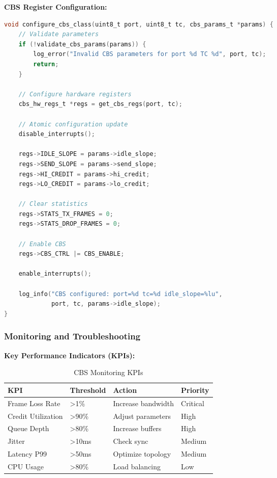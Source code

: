 \documentclass[10pt, journal, compsoc]{IEEEtran}
\begin{document}
\textbf{CBS Register Configuration:}
\begin{lstlisting}[language=C, caption=CBS Configuration Template]
void configure_cbs_class(uint8_t port, uint8_t tc, cbs_params_t *params) {
    // Validate parameters
    if (!validate_cbs_params(params)) {
        log_error("Invalid CBS parameters for port %d TC %d", port, tc);
        return;
    }
    
    // Configure hardware registers
    cbs_hw_regs_t *regs = get_cbs_regs(port, tc);
    
    // Atomic configuration update
    disable_interrupts();
    
    regs->IDLE_SLOPE = params->idle_slope;
    regs->SEND_SLOPE = params->send_slope;
    regs->HI_CREDIT = params->hi_credit;
    regs->LO_CREDIT = params->lo_credit;
    
    // Clear statistics
    regs->STATS_TX_FRAMES = 0;
    regs->STATS_DROP_FRAMES = 0;
    
    // Enable CBS
    regs->CBS_CTRL |= CBS_ENABLE;
    
    enable_interrupts();
    
    log_info("CBS configured: port=%d tc=%d idle_slope=%lu", 
             port, tc, params->idle_slope);
}
\end{lstlisting}

\subsubsection{Monitoring and Troubleshooting}

\textbf{Key Performance Indicators (KPIs):}
\begin{table}[h]
\centering
\caption{CBS Monitoring KPIs}
\label{tab:monitoring_kpis}
\begin{tabular}{llll}
\toprule
\textbf{KPI} & \textbf{Threshold} & \textbf{Action} & \textbf{Priority} \\
\midrule
Frame Loss Rate & >1\% & Increase bandwidth & Critical \\
Credit Utilization & >90\% & Adjust parameters & High \\
Queue Depth & >80\% & Increase buffers & High \\
Jitter & >10ms & Check sync & Medium \\
Latency P99 & >50ms & Optimize topology & Medium \\
CPU Usage & >80\% & Load balancing & Low \\
\bottomrule
\end{tabular}
\end{table}
\end{document}
